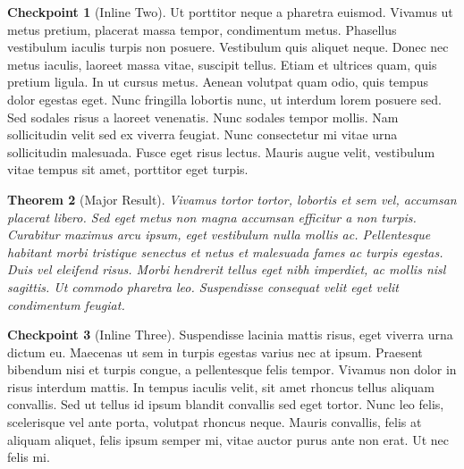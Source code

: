\documentclass{amsart}
\theoremstyle{plain}%
\newtheorem{theorem}{Theorem}[section]
\theoremstyle{definition}%
\newtheorem{inlineexercise}[theorem]{Checkpoint}
\theoremstyle{remark}%
\numberwithin{equation}{section}
\begin{document}
\begin{inlineexercise}[Inline Two]\label{duplicate-inline}%
%
Ut porttitor neque a pharetra euismod. Vivamus ut metus pretium, placerat massa tempor, condimentum metus. Phasellus vestibulum iaculis turpis non posuere. Vestibulum quis aliquet neque. Donec nec metus iaculis, laoreet massa vitae, suscipit tellus. Etiam et ultrices quam, quis pretium ligula. In ut cursus metus. Aenean volutpat quam odio, quis tempus dolor egestas eget. Nunc fringilla lobortis nunc, ut interdum lorem posuere sed. Sed sodales risus a laoreet venenatis. Nunc sodales tempor mollis. Nam sollicitudin velit sed ex viverra feugiat. Nunc consectetur mi vitae urna sollicitudin malesuada. Fusce eget risus lectus. Mauris augue velit, vestibulum vitae tempus sit amet, porttitor eget turpis.%
\end{inlineexercise}%
\begin{theorem}[Major Result]\label{section-exercises-single-8}%
%
Vivamus tortor tortor, lobortis et sem vel, accumsan placerat libero. Sed eget metus non magna accumsan efficitur a non turpis. Curabitur maximus arcu ipsum, eget vestibulum nulla mollis ac. Pellentesque habitant morbi tristique senectus et netus et malesuada fames ac turpis egestas. Duis vel eleifend risus. Morbi hendrerit tellus eget nibh imperdiet, ac mollis nisl sagittis. Ut commodo pharetra leo. Suspendisse consequat velit eget velit condimentum feugiat.%
\end{theorem}
\begin{inlineexercise}[Inline Three]\label{section-exercises-single-9}%
%
Suspendisse lacinia mattis risus, eget viverra urna dictum eu. Maecenas ut sem in turpis egestas varius nec at ipsum. Praesent bibendum nisi et turpis congue, a pellentesque felis tempor. Vivamus non dolor in risus interdum mattis. In tempus iaculis velit, sit amet rhoncus tellus aliquam convallis. Sed ut tellus id ipsum blandit convallis sed eget tortor. Nunc leo felis, scelerisque vel ante porta, volutpat rhoncus neque. Mauris convallis, felis at aliquam aliquet, felis ipsum semper mi, vitae auctor purus ante non erat. Ut nec felis mi.%
\end{inlineexercise}%
%
%
\typeout{************************************************}
\typeout{************************************************}
%
\end{document}
